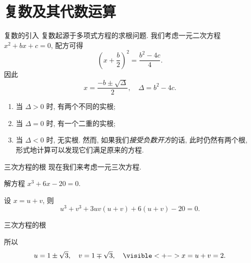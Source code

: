 \section{复数及其代数运算}


\begin{frame}{复数的引入}
\onslide<+->复数起源于多项式方程的求根问题.
\onslide<+->我们考虑一元二次方程 $x^2+bx+c=0$,
\onslide<+->配方可得
	\[\left(x+\frac b2\right)^2=\frac{b^2-4c}4.\]
\onslide<+->因此
	\[x=\frac{-b\pm\sqrt\Delta}2,\quad \Delta=b^2-4c.\]
	\vspace{-\baselineskip}
\begin{enumerate}
\item 当 $\Delta>0$ 时, 有两个不同的实根;
\item 当 $\Delta=0$ 时, 有一个二重的实根;
\item 当 $\Delta<0$ 时, 无实根.
\onslide<+->然而, 如果我们\emph{接受负数开方}的话, 此时仍然有两个根, 形式地计算可以发现它们满足原来的方程.
\end{enumerate}
\end{frame}


\begin{frame}{三次方程的根}
\onslide<+->现在我们来考虑一元三次方程.
\onslide<+->
\begin{example}
解方程 $x^3+6x-20=0$.
\end{example}
\onslide<+->
\begin{solution}
设 $x=u+v$, 则
	\[u^3+v^3+3uv(u+v)+6(u+v)-20=0.\]
\visible<+->{我们希望
	\[u^3+v^3=20,\quad uv=-2,\]}
\visible<+->{解得
	\[u^3=10\pm\sqrt{108}\visible<+->{=(1\pm\sqrt3)^3.}\]}
\vspace{-\baselineskip}
\end{solution}
\end{frame}


\begin{frame}{三次方程的根}
\onslide<+->
\begin{solutionc}
\indent 所以 \[u=1\pm\sqrt3,\quad v=1\mp\sqrt 3,\quad
	\visible<+->{x=u+v=2.}\]
\vspace{-\baselineskip}
\end{solutionc}
\end{frame}



